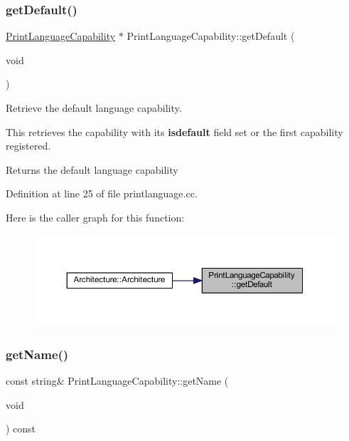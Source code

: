 \subsubsection{\texorpdfstring{getDefault()}{getDefault()}}
{\footnotesize\ttfamily \mbox{\hyperlink{class_print_language_capability}{Print\+Language\+Capability}} $\ast$ Print\+Language\+Capability\+::get\+Default (\begin{DoxyParamCaption}\item[{void}]{ }\end{DoxyParamCaption})\hspace{0.3cm}{\ttfamily [static]}}



Retrieve the default language capability. 

This retrieves the capability with its {\bfseries{isdefault}} field set or the first capability registered. \begin{DoxyReturn}{Returns}
the default language capability 
\end{DoxyReturn}


Definition at line 25 of file printlanguage.\+cc.

Here is the caller graph for this function\+:
\nopagebreak
\begin{figure}[H]
\begin{center}
\leavevmode
\includegraphics[width=350pt]{class_print_language_capability_a2902f4f1ca2e24f215dcd431dbedc310_icgraph}
\end{center}
\end{figure}
\mbox{\label{class_print_language_capability_abca4d334109a9e47968240cccbf72236}} 
\subsubsection{\texorpdfstring{getName()}{getName()}}
{\footnotesize\ttfamily const string\& Print\+Language\+Capability\+::get\+Name (\begin{DoxyParamCaption}\item[{void}]{ }\end{DoxyParamCaption}) const\hspace{0.3cm}{\ttfamily [inline]}}



